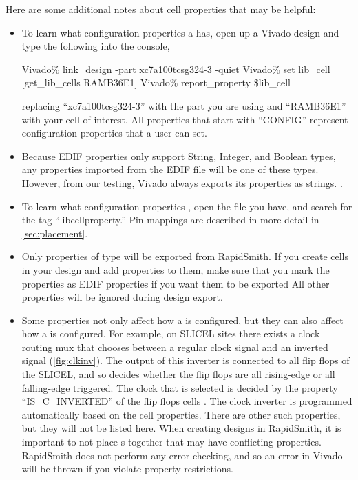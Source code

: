 \noindent Here are some additional notes about  cell properties that may be
helpful:

\begin{itemize}
  \item To learn what configuration properties a  has, open up a
  Vivado design and type the following into the console,
  
  \begin{code}
  Vivado\% link_design -part xc7a100tcsg324-3 -quiet
  Vivado\% set lib_cell [get\_lib\_cells RAMB36E1]
  Vivado\% report_property \$lib_cell 
  \end{code}
  
  replacing ``xc7a100tcsg324-3'' with the part you are using and ``RAMB36E1'' with your
  cell of interest. All properties that start with ``CONFIG'' represent
  configuration properties that a user can set.
  \item Because EDIF properties only support String, Integer, and Boolean types,
  any properties imported from the EDIF file will be one of these types.
  However, from our testing, Vivado always exports its properties as strings.
  .
  \item To learn what configuration properties , open the  file you have, and search for the
  tag ``libcellproperty.'' Pin mappings are described in more detail in
  \autoref{sec:placement}.
  \item Only properties of type  will be exported from
  RapidSmith.
  If you create cells in your design and add properties to them, make sure that you
  mark the properties as EDIF properties if you want them to be exported
  All other properties will be ignored during design export.
  \item Some properties not only affect how a  is configured, but they
  can also affect how a  is configured. For example, on SLICEL
  sites there exists a clock routing mux that chooses between a regular clock
  signal and an inverted signal (\autoref{fig:clkinv}). The output of this
  inverter is connected to all flip flops of the SLICEL, and so decides whether the flip flops are
  all rising-edge or all falling-edge triggered. The clock that is selected is
  decided by the property ``IS\_C\_INVERTED'' of the flip flops cells . The clock inverter is programmed
  automatically based on the cell properties. There are other such properties,
  but they will not be listed here. When creating designs in RapidSmith, it is
  important to not place s together that may have conflicting
  properties. RapidSmith does not perform any error checking, and so an error
  in Vivado will be thrown if you violate property restrictions.
  

\end{itemize}
